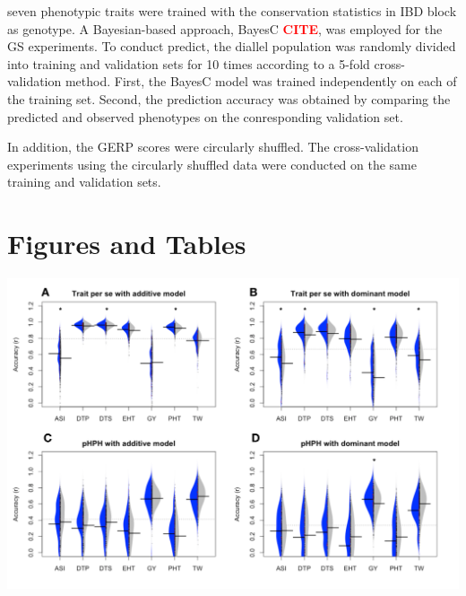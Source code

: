 \documentclass[10pt]{article}
\newcommand{\sme}[1]{\textcolor{red}{\bf #1}}
\begin{document}
seven phenotypic traits were trained with the conservation statistics in IBD block as genotype.
A Bayesian-based approach, BayesC \sme{CITE}, was employed for the GS experiments. To conduct predict, the diallel population was randomly divided into training and validation sets for 10 times according to a 5-fold cross-validation method. First, the BayesC model was trained independently on each of the training set. Second, the prediction accuracy was obtained by comparing the predicted and observed phenotypes on the conresponding validation set. 


In addition, the GERP scores were circularly shuffled. The cross-validation experiments using the circularly shuffled data were conducted on the same training and validation sets.  


\clearpage



\pagebreak
\section*{Figures and Tables}

\begin{center}\vspace{1cm}
\includegraphics[width=0.8\linewidth]{cvres.pdf}
\end{center}\vspace{1cm}
\end{document}
